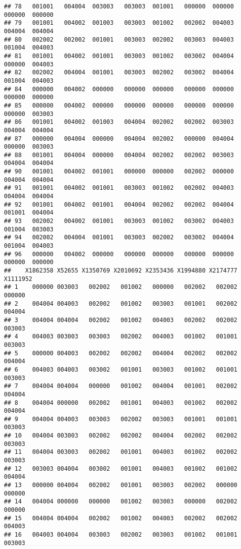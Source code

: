 \documentclass[
]{article}
\begin{document}
\begin{verbatim}
## 78   001001   004004  003003   003003  001001   000000  000000   000000  000000
## 79   001001   004002  001003   003003  001002   002002  004003   004004  004004
## 80   002002   002002  001001   003003  002002   003003  004003   001004  004003
## 81   001001   004002  001001   003003  001002   003002  004004   000000  004003
## 82   002002   004004  001001   003003  002002   003002  004004   001004  004003
## 84   000000   004002  000000   000000  000000   000000  000000   000000  000000
## 85   000000   004002  000000   000000  000000   000000  000000   000000  003003
## 86   001001   004002  001003   004004  002002   002002  003003   004004  004004
## 87   000000   004004  000000   004004  002002   000000  004004   000000  003003
## 88   001001   004004  000000   004004  002002   002002  003003   004004  004004
## 90   001001   004002  001001   000000  000000   002002  000000   004004  004004
## 91   001001   004002  001001   003003  001002   002002  004003   004004  004004
## 92   001001   004002  001001   004004  002002   002002  004004   001001  004004
## 93   002002   004002  001001   003003  001002   003002  004003   001004  003003
## 94   002002   004004  001001   003003  002002   003002  004004   001004  004003
## 96   000000   004002  000000   000000  000000   000000  000000   000000  000000
##    X1862358 X52655 X1350769 X2010692 X2353436 X1994880 X2174777 X1111952
## 1    000000 003003   002002   001002   000000   002002   002002   000000
## 2    004004 004003   002002   001002   003003   001001   002002   004004
## 3    004004 004004   002002   001002   004003   002002   002002   003003
## 4    004003 003003   003003   002002   004003   001002   001001   003003
## 5    000000 004003   002002   002002   004004   002002   002002   004004
## 6    004003 004003   003002   001001   003003   001002   001001   003003
## 7    004004 004004   000000   001002   004004   001001   002002   004004
## 8    004004 000000   002002   001001   004003   001002   002002   004004
## 9    004004 004003   003003   002002   003003   001001   001001   003003
## 10   004004 003003   002002   002002   004004   002002   002002   003003
## 11   004004 003003   002002   001001   004003   001002   002002   003003
## 12   003003 004004   003002   001001   004003   001002   001002   004004
## 13   000000 004004   002002   001001   003003   002002   000000   000000
## 14   004004 000000   000000   001002   003003   000000   002002   000000
## 15   004004 004004   002002   001002   004003   002002   002002   004003
## 16   004003 004004   003003   002002   003003   001002   001001   003003

\end{verbatim}
\end{document}
